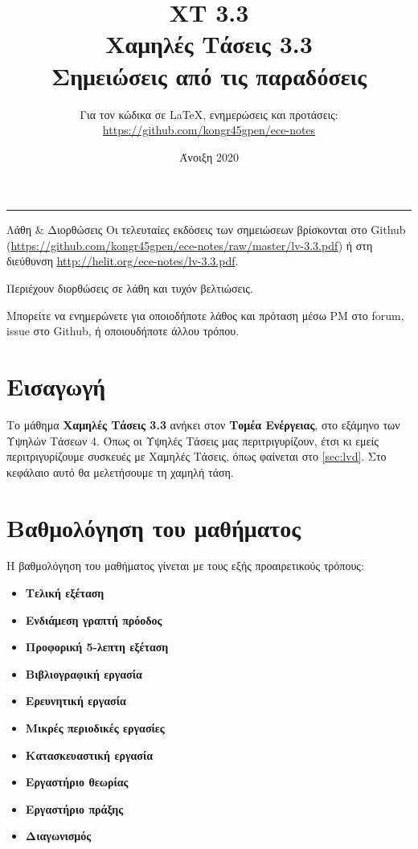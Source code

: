 \documentclass[11pt,a4paper,notitlepage,fleqn]{article}
\title{ΧΤ 3.3
	\\
	{ 
		Χαμηλές Τάσεις 3.3
		\\
		\normalsize Σημειώσεις από τις παραδόσεις}
	}
\date{Άνοιξη 2020
	\\
	{ 
	}
}
\author{
	Για τον κώδικα σε \LaTeX, ενημερώσεις και προτάσεις:
	\\
	\url{https://github.com/kongr45gpen/ece-notes}}
\begin{document}
\maketitle

\hrule
\vspace{50pt}

\begin{infobox}{Λάθη \& Διορθώσεις}
	Οι τελευταίες εκδόσεις των σημειώσεων βρίσκονται στο Github
	(\url{https://github.com/kongr45gpen/ece-notes/raw/master/lv-3.3.pdf}) ή
	στη διεύθυνση \url{http://helit.org/ece-notes/lv-3.3.pdf}.
	
	Περιέχουν διορθώσεις σε λάθη και τυχόν βελτιώσεις.
	
	\tcblower
	
	Μπορείτε να ενημερώνετε για οποιοδήποτε λάθος και πρόταση
	μέσω PM στο forum, issue στο Github, ή οποιουδήποτε άλλου τρόπου.
\end{infobox}

{
	\hypersetup{linkcolor=black}
	\tableofcontents
}

\newpage

\section{Εισαγωγή}
Το μάθημα \textbf{Χαμηλές Τάσεις 3.3} ανήκει στον \textbf{Τομέα Ενέργειας}, στο εξάμηνο των Υψηλών Τάσεων 4. Όπως οι Υψηλές Τάσεις μας περιτριγυρίζουν, έτσι κι εμείς περιτριγυρίζουμε συσκευές με Χαμηλές Τάσεις, όπως φαίνεται στο \autoref{sec:lvd}. Στο κεφάλαιο αυτό θα μελετήσουμε τη χαμηλή τάση.

\section{Βαθμολόγηση του μαθήματος}

Η βαθμολόγηση του μαθήματος γίνεται με τους εξής προαιρετικούς τρόπους:
\begin{itemize}
	\setlength\itemsep{0em}
	\item \textbf{Τελική εξέταση}
	\item \textbf{Ενδιάμεση γραπτή πρόοδος}
	\item \textbf{Προφορική 5-λεπτη εξέταση}
	\item \textbf{Βιβλιογραφική εργασία}
	\item \textbf{Ερευνητική εργασία}
	\item \textbf{Μικρές περιοδικές εργασίες}
	\item \textbf{Κατασκευαστική εργασία}
	\item \textbf{Εργαστήριο θεωρίας}
	\item \textbf{Εργαστήριο πράξης}
	\item \textbf{Διαγωνισμός}
\end{itemize}
\end{document}
